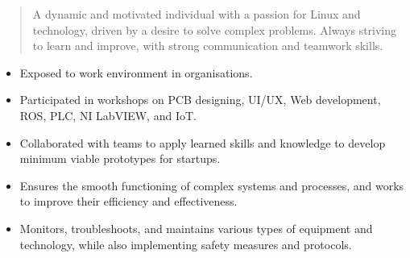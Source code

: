 \documentclass[10pt,a4paper,ragged2e,withhyper]{altacv}
\begin{document}
\begin{paracol}{2}
        
        
        \newpage
        
        \switchcolumn
        
            \begin{quote}
                A dynamic and motivated individual with a passion for Linux and technology, driven by a desire to solve complex problems. Always striving to learn and improve, with strong communication and teamwork skills.
            \end{quote}
        
            \begin{itemize}
                \item Exposed to work environment in organisations. 
                \item Participated in workshops on PCB designing, UI/UX, Web development, ROS, PLC, NI LabVIEW, and IoT. 
                \item Collaborated with teams to apply learned skills and knowledge to develop minimum viable prototypes for startups.
            \end{itemize}
            \divider
            
            \begin{itemize}
                \item Ensures the smooth functioning of complex systems and processes, and works to improve their efficiency and effectiveness.
                \item     Monitors, troubleshoots, and maintains various types of equipment and technology, while also implementing safety measures and protocols.



\end{itemize}
\end{paracol}
\end{document}
